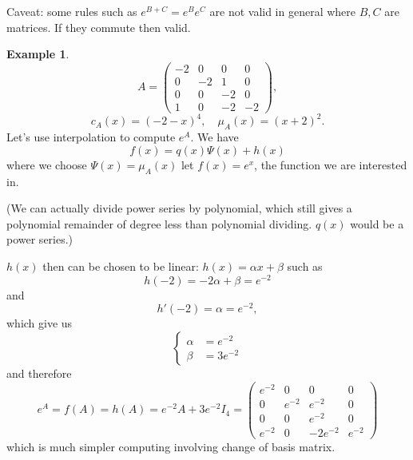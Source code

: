 \documentclass[a4paper]{article}
\theoremstyle{definition}
\newtheorem{example}[defn]{Example}
\begin{document}
Caveat: some rules such as $e^{B+C}=e^B e^C$ are not valid in general where $B,C$ are matrices. If they commute then valid.
\begin{example}
\[
A=\begin{pmatrix}-2&0&0&0\\0&-2&1&0\\0&0&-2&0\\1&0&-2&-2\end{pmatrix},
\]
\[
c_A(x)=(-2-x)^4,\quad \mu_A(x)=(x+2)^2 .
\]
Let's use interpolation to compute $e^A$. We have
\[
f(x)=q(x)\Psi(x)+h(x)
\]
where we choose $\Psi(x)=\mu_A(x)$ let $f(x)=e^x$, the function we are interested in.

(We can actually divide power series by polynomial, which still gives a polynomial remainder of degree less than polynomial dividing. $q(x)$ would be a power series.)

$h(x)$ then can be chosen to be linear: $h(x)=\alpha x+\beta$ such as
\[
h(-2)=-2\alpha +\beta = e^{-2}
\]
and
\[
h'(-2)=\alpha = e^{-2} ,
\]
which give us
\[
\left\{\begin{aligned}\alpha&=e^{-2}\\ \beta &= 3e^{-2} \end{aligned}\right.
\]
and therefore
\[
e^A=f(A)=h(A)=e^{-2}A+3e^{-2}I_4=\begin{pmatrix}
    e^{-2} &0&0&0\\
    0&e^{-2}&e^{-2}&0\\
    0&0&e^{-2}&0\\
    e^{-2}&0&-2e^{-2}&e^{-2}
\end{pmatrix}
\]
which is much simpler computing involving change of basis matrix.
\end{example}
\end{document}
